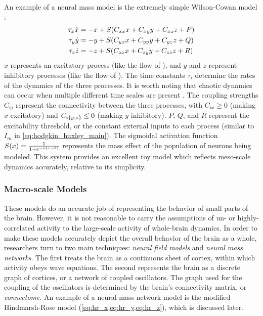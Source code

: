 An example of a neural mass model is the extremely simple Wilson-Cowan model \cite{Wang2012}:
\begin{align}
  \label{eq:wc_x}
  \tau_{x} \dot{x}
  &=
    -x + S \pqty{C_{x x} x + C_{x y} y + C_{x z} z + P} \\
  \label{eq:wc_y}
  \tau_{y} \dot{y}
  &=
    -y + S \pqty{C_{y x} x + C_{y y} y + C_{y z} z + Q} \\
  \label{eq:wc_z}
  \tau_{z} \dot{z}
  &=
    -z + S \pqty{C_{z x} x + C_{z y} y + C_{z z} z + R}
\end{align}
$x$ represents an excitatory process (like the flow of ), and $y$ and $z$ represent inhibitory processes (like the flow of ).
The time constants $\tau_{i}$ determine the rates of the dynamics of the three processes.
It is worth noting that chaotic dynamics can occur when multiple different time scales are present \cite{Breakspear2017}.
The coupling strengths $C_{i j}$ represent the connectivity between the three processes, with $C_{i x} \geq 0$ (making $x$ excitatory) and $C_{i \Bqty{y, z}} \leq 0$ (making $y$ inhibitory).
$P$, $Q$, and $R$ represent the excitability threshold, or the constant external inputs to each process (similar to $I_{m}$ in \cref{eq:hodgkin_huxley_main}).
The sigmoidal activation function $S(x) = \frac{1}{1 + e^{-a \pqty{x - \theta}}}$ represents the mass effect of the population of neurons being modeled.
This system provides an excellent toy model which reflects meso-scale dynamics accurately, relative to its simplicity.

\subsubsection{Macro-scale Models}
\label{sec:intro_seizures_neuroanatomy_macro_scale}
These models do an accurate job of representing the behavior of small parts of the brain.
However, it is not reasonable to carry the assumptions of un- or highly-correlated activity to the large-scale activity of whole-brain dynamics.
In order to make these models accurately depict the overall behavior of the brain as a whole, researchers turn to two main techniques: \textit{neural field models} and \textit{neural mass networks}.
The first treats the brain as a continuous sheet of cortex, within which activity obeys wave equations.
The second represents the brain as a discrete graph of cortices, or a network of coupled oscillators.
The graph used for the coupling of the oscillators is determined by the brain's connectivity matrix, or \textit{connectome}.
An example of a neural mass network model is the modified Hindmarsh-Rose model (\cref{eq:hr_x,eq:hr_y,eq:hr_z}), which is discussed later.


